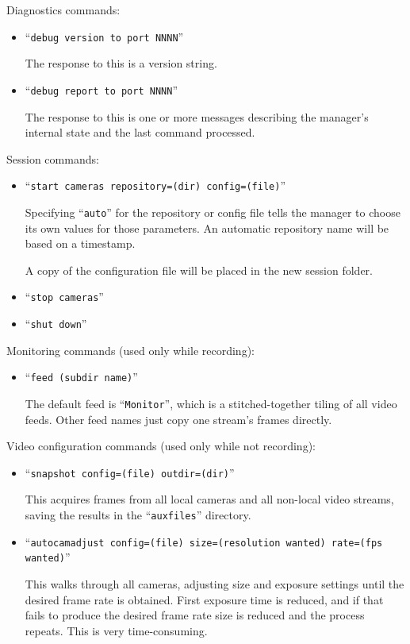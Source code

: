 Diagnostics commands:
\begin{itemize}
\item ``\verb+debug version to port NNNN+''

The response to this is a version string.

\item ``\verb+debug report to port NNNN+''

The response to this is one or more messages describing the manager's internal
state and the last command processed.
\end{itemize}

Session commands:

\begin{itemize}
\item ``\verb+start cameras repository=(dir) config=(file)+''

Specifying ``\verb+auto+'' for the repository or config file tells the
manager to choose its own values for those parameters. An automatic
repository name will be based on a timestamp.

A copy of the configuration file will be placed in the new session folder.

\item ``\verb+stop cameras+''
\item ``\verb+shut down+''
\end{itemize}

\clearpage
Monitoring commands (used only while recording):
\begin{itemize}
\item ``\verb+feed (subdir name)+''

The default feed is ``\verb+Monitor+'', which is a stitched-together tiling
of all video feeds. Other feed names just copy one stream's frames directly.
\end{itemize}

Video configuration commands (used only while not recording):
\begin{itemize}
\item ``\verb+snapshot config=(file) outdir=(dir)+''

This acquires frames from all local cameras and all non-local video streams,
saving the results in the ``\verb+auxfiles+'' directory.

\item
``\verb+autocamadjust config=(file) size=(resolution wanted) rate=(fps wanted)+''

This walks through all cameras, adjusting size and exposure settings until
the desired frame rate is obtained. First exposure time is reduced, and if
that fails to produce the desired frame rate size is reduced and the process
repeats. This is very time-consuming.
\end{itemize}

